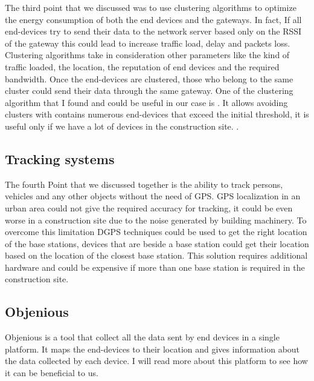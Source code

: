 The third point that we discussed was to use clustering algorithms to optimize the energy consumption of both the end devices and the gateways.
In fact,
	If all end-devices try to send their data to the network server based only on the RSSI of the gateway this could lead to increase traffic load,
	delay and packets loss.
Clustering algorithms take in consideration other parameters like the kind of traffic loaded, the location,
	the reputation of end devices and the required bandwidth.
Once the end-devices are clustered,
	those who belong to the same cluster could send their data through the same gateway.
One of the clustering algorithm that I found and could be useful in our case is .
It allows avoiding clusters with contains numerous end-devices that exceed the initial threshold,
	it is useful only if we have a lot of devices in the construction site.
.
\subsection{Tracking systems}

The fourth Point that we discussed together is the ability to track persons,
	vehicles and any other objects without the need of GPS.
GPS localization in an urban area could not give the required accuracy for tracking,
	it could be even worse in a construction site due to the noise generated by building machinery.
To overcome this limitation DGPS techniques could be used to get the right location of the base stations,
	devices that are beside a base station could get their location based on the location of the closest base station.
This solution requires additional hardware and could be expensive if more than one base station is required in the construction site.

\subsection{Objenious}

Objenious is a tool that collect all the data sent by end devices in a single platform.
It maps the end-devices to their location and gives information about the data collected by each device.
I will read more about this platform to see how it can be beneficial to us.

